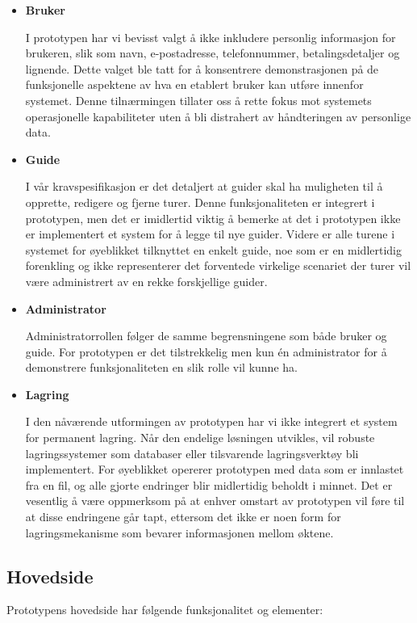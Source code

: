 \documentclass[../doc]{subfiles}
\begin{document}
\begin{itemize}
    \item \textbf{Bruker}

    I prototypen har vi bevisst valgt å ikke inkludere personlig informasjon for brukeren, slik som navn, e-postadresse, telefonnummer, betalingsdetaljer og lignende. Dette valget ble tatt for å konsentrere demonstrasjonen på de funksjonelle aspektene av hva en etablert bruker kan utføre innenfor systemet. Denne tilnærmingen tillater oss å rette fokus mot systemets operasjonelle kapabiliteter uten å bli distrahert av håndteringen av personlige data.
    
    \item \textbf{Guide}
    
    I vår kravspesifikasjon er det detaljert at guider skal ha muligheten til å opprette, redigere og fjerne turer. Denne funksjonaliteten er integrert i prototypen, men det er imidlertid viktig å bemerke at det i prototypen ikke er implementert et system for å legge til nye guider. Videre er alle turene i systemet for øyeblikket tilknyttet en enkelt guide, noe som er en midlertidig forenkling og ikke representerer det forventede virkelige scenariet der turer vil være administrert av en rekke forskjellige guider.
    \item \textbf{Administrator}
    
    Administratorrollen følger de samme begrensningene som både bruker og guide. For prototypen er det tilstrekkelig men kun én administrator for å demonstrere funksjonaliteten en slik rolle vil kunne ha.

    \item \textbf{Lagring}
    
    I den nåværende utformingen av prototypen har vi ikke integrert et system for permanent lagring. Når den endelige løsningen utvikles, vil robuste lagringssystemer som databaser eller tilsvarende lagringsverktøy bli implementert. For øyeblikket opererer prototypen med data som er innlastet fra en fil, og alle gjorte endringer blir midlertidig beholdt i minnet. Det er vesentlig å være oppmerksom på at enhver omstart av prototypen vil føre til at disse endringene går tapt, ettersom det ikke er noen form for lagringsmekanisme som bevarer informasjonen mellom øktene.

\end{itemize}
\subsection{Hovedside}
Prototypens hovedside har følgende funksjonalitet og elementer:
\end{document}

